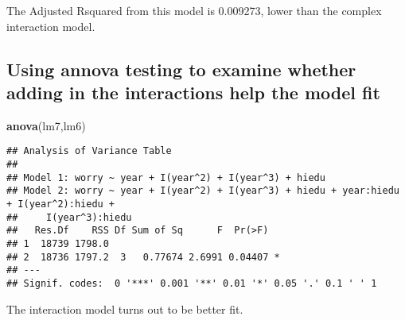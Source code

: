 \documentclass[]{article}
\newenvironment{Shaded}{\begin{snugshade}}{\end{snugshade}}
\newcommand{\KeywordTok}[1]{\textcolor[rgb]{0.13,0.29,0.53}{\textbf{#1}}}
\newcommand{\NormalTok}[1]{#1}
\begin{document}
The Adjusted Rsquared from this model is 0.009273, lower than the
complex interaction model.

\hypertarget{using-annova-testing-to-examine-whether-adding-in-the-interactions-help-the-model-fit}{%
\subsection{Using annova testing to examine whether adding in the
interactions help the model
fit}\label{using-annova-testing-to-examine-whether-adding-in-the-interactions-help-the-model-fit}}

\begin{Shaded}
\begin{Highlighting}[]
\KeywordTok{anova}\NormalTok{(lm7,lm6)}
\end{Highlighting}
\end{Shaded}

\begin{verbatim}
## Analysis of Variance Table
## 
## Model 1: worry ~ year + I(year^2) + I(year^3) + hiedu
## Model 2: worry ~ year + I(year^2) + I(year^3) + hiedu + year:hiedu + I(year^2):hiedu + 
##     I(year^3):hiedu
##   Res.Df    RSS Df Sum of Sq      F  Pr(>F)  
## 1  18739 1798.0                              
## 2  18736 1797.2  3   0.77674 2.6991 0.04407 *
## ---
## Signif. codes:  0 '***' 0.001 '**' 0.01 '*' 0.05 '.' 0.1 ' ' 1
\end{verbatim}

The interaction model turns out to be better fit.
\end{document}
